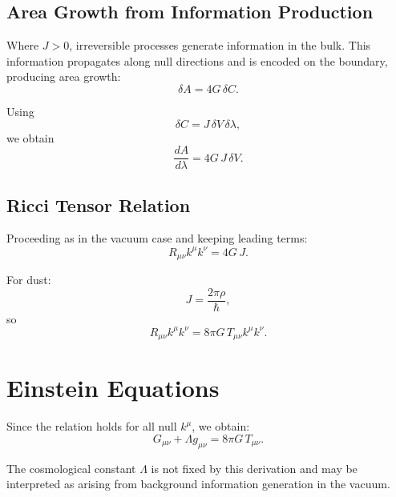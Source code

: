 \documentclass[12pt]{article}
\begin{document}
\subsection{Area Growth from Information Production}

Where $J>0$, irreversible processes generate information in the bulk.
This information propagates along null directions and is encoded on
the boundary, producing area growth:
\begin{equation}
\delta A = 4G\, \delta C.
\end{equation}

Using
\begin{equation}
\delta C = J\, \delta V\, \delta \lambda,
\end{equation}
we obtain
\begin{equation}
\frac{dA}{d\lambda} = 4G\, J\, \delta V.
\end{equation}

\subsection{Ricci Tensor Relation}

Proceeding as in the vacuum case and keeping leading terms:
\begin{equation}
R_{\mu\nu}k^\mu k^\nu = 4G\, J.
\end{equation}

For dust:
\begin{equation}
J = \frac{2\pi \rho}{\hbar},
\end{equation}
so
\begin{equation}
R_{\mu\nu}k^\mu k^\nu = 8\pi G\, T_{\mu\nu}k^\mu k^\nu.
\end{equation}

\section{Einstein Equations}

Since the relation holds for all null $k^\mu$, we obtain:
\begin{equation}
G_{\mu\nu} + \Lambda g_{\mu\nu} = 8\pi G\, T_{\mu\nu}.
\end{equation}

The cosmological constant $\Lambda$ is not fixed by this
derivation and may be interpreted as arising from background
information generation in the vacuum.
\end{document}
